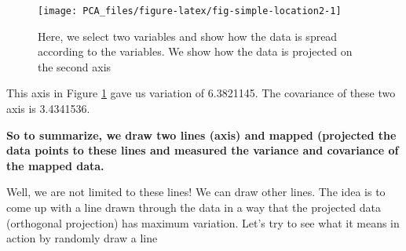 \documentclass[
]{book}
\theoremstyle{definition}
\theoremstyle{definition}
\theoremstyle{definition}
\theoremstyle{remark}
\begin{document}
\begin{figure}

{\centering \texttt{[image: PCA\_files/figure-latex/fig-simple-location2-1]} 

}

\caption{Here, we select two variables and show how the data is spread according to the variables. We show how the data is projected on the second axis}\label{fig:fig-simple-location2}
\end{figure}

This axis in Figure \ref{fig:fig-simple-location2} gave us variation of 6.3821145. The covariance of these two axis is 3.4341536.

\textbf{So to summarize, we draw two lines (axis) and mapped (projected the data points to these lines and measured the variance and covariance of the mapped data.}

Well, we are not limited to these lines! We can draw other lines. The idea is to come up with a line drawn through the data in a way that the projected data (orthogonal projection) has maximum variation. Let's try to see what it means in action by randomly draw a line
\end{document}
